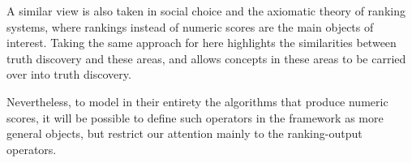 \documentclass[../main.tex]{subfiles}
\begin{document}
A similar view is also taken in social choice and the axiomatic theory of
ranking systems, where rankings instead of numeric scores are the main objects
of interest. Taking the same approach for here highlights the similarities
between truth discovery and these areas, and allows concepts in these areas to
be carried over into truth discovery.

Nevertheless, to model in their entirety the algorithms that produce numeric
scores, it will be possible to define such operators in the framework as more
general objects, but restrict our attention mainly to the ranking-output
operators.
\end{document}
